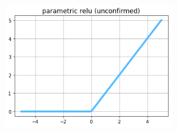 \begin{figure}
\centering
\includegraphics[width=0.65\textwidth]{./sync_imgs/act/notsmooth/prelu.png}
\label{fig:act_notsmooth_prelu}
\end{figure}

